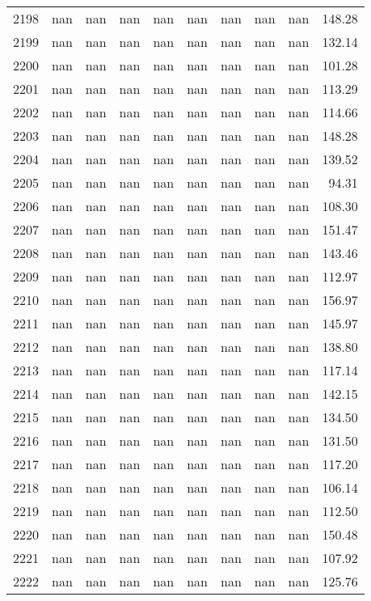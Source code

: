 \begin{tabular}{lrrrrrrrrr}
2198 & nan & nan & nan & nan & nan & nan & nan & nan & 148.28 \\
2199 & nan & nan & nan & nan & nan & nan & nan & nan & 132.14 \\
2200 & nan & nan & nan & nan & nan & nan & nan & nan & 101.28 \\
2201 & nan & nan & nan & nan & nan & nan & nan & nan & 113.29 \\
2202 & nan & nan & nan & nan & nan & nan & nan & nan & 114.66 \\
2203 & nan & nan & nan & nan & nan & nan & nan & nan & 148.28 \\
2204 & nan & nan & nan & nan & nan & nan & nan & nan & 139.52 \\
2205 & nan & nan & nan & nan & nan & nan & nan & nan & 94.31 \\
2206 & nan & nan & nan & nan & nan & nan & nan & nan & 108.30 \\
2207 & nan & nan & nan & nan & nan & nan & nan & nan & 151.47 \\
2208 & nan & nan & nan & nan & nan & nan & nan & nan & 143.46 \\
2209 & nan & nan & nan & nan & nan & nan & nan & nan & 112.97 \\
2210 & nan & nan & nan & nan & nan & nan & nan & nan & 156.97 \\
2211 & nan & nan & nan & nan & nan & nan & nan & nan & 145.97 \\
2212 & nan & nan & nan & nan & nan & nan & nan & nan & 138.80 \\
2213 & nan & nan & nan & nan & nan & nan & nan & nan & 117.14 \\
2214 & nan & nan & nan & nan & nan & nan & nan & nan & 142.15 \\
2215 & nan & nan & nan & nan & nan & nan & nan & nan & 134.50 \\
2216 & nan & nan & nan & nan & nan & nan & nan & nan & 131.50 \\
2217 & nan & nan & nan & nan & nan & nan & nan & nan & 117.20 \\
2218 & nan & nan & nan & nan & nan & nan & nan & nan & 106.14 \\
2219 & nan & nan & nan & nan & nan & nan & nan & nan & 112.50 \\
2220 & nan & nan & nan & nan & nan & nan & nan & nan & 150.48 \\
2221 & nan & nan & nan & nan & nan & nan & nan & nan & 107.92 \\
2222 & nan & nan & nan & nan & nan & nan & nan & nan & 125.76 \\

\end{tabular}
